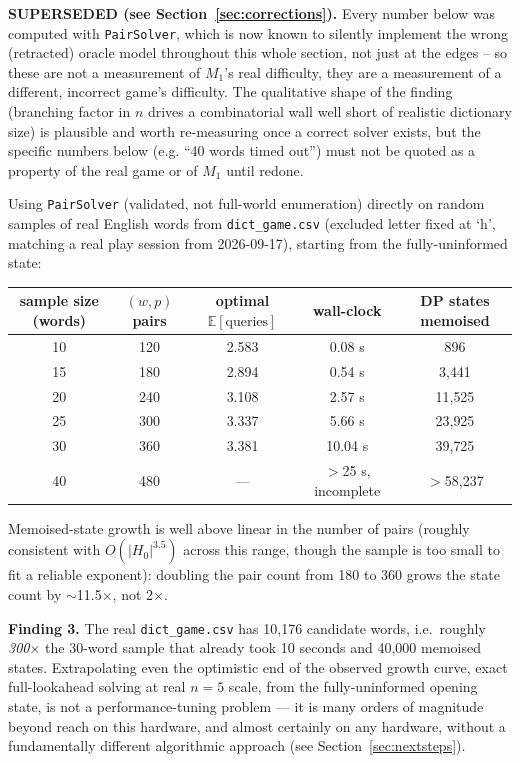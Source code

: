 \documentclass[11pt]{article}
\begin{document}
\textbf{SUPERSEDED (see Section~\ref{sec:corrections}).} Every number
below was computed with \texttt{PairSolver}, which is now known to
silently implement the wrong (retracted) oracle model throughout this
whole section, not just at the edges -- so these are not a measurement of
$M_1$'s real difficulty, they are a measurement of a different, incorrect
game's difficulty. The qualitative shape of the finding (branching factor
in $n$ drives a combinatorial wall well short of realistic dictionary
size) is plausible and worth re-measuring once a correct solver exists,
but the specific numbers below (e.g. ``40 words timed out'') must not be
quoted as a property of the real game or of $M_1$ until redone.

Using \texttt{PairSolver} (validated, not full-world enumeration) directly
on random samples of real English words from \texttt{dict\_game.csv}
(excluded letter fixed at `h', matching a real play session from
2026-09-17), starting from the fully-uninformed state:

\begin{center}
\begin{tabular}{ccccc}
\toprule
sample size (words) & $(w,p)$ pairs & optimal $\mathbb{E}[\text{queries}]$ & wall-clock & DP states memoised \\
\midrule
10 & 120 & 2.583 & 0.08 s  & 896 \\
15 & 180 & 2.894 & 0.54 s  & 3{,}441 \\
20 & 240 & 3.108 & 2.57 s  & 11{,}525 \\
25 & 300 & 3.337 & 5.66 s  & 23{,}925 \\
30 & 360 & 3.381 & 10.04 s & 39{,}725 \\
40 & 480 & --- & $>$25 s, incomplete & $>$58{,}237 \\
\bottomrule
\end{tabular}
\end{center}

Memoised-state growth is well above linear in the number of pairs (roughly
consistent with $O(|H_0|^{3.5})$ across this range, though the sample is
too small to fit a reliable exponent): doubling the pair count from 180 to
360 grows the state count by $\sim$11.5$\times$, not 2$\times$.

\textbf{Finding 3.} The real \texttt{dict\_game.csv} has 10{,}176
candidate words, i.e.\ roughly \emph{300$\times$} the 30-word sample that
already took 10 seconds and 40{,}000 memoised states. Extrapolating even
the optimistic end of the observed growth curve, exact full-lookahead
solving at real $n=5$ scale, from the fully-uninformed opening state, is
not a performance-tuning problem --- it is many orders of magnitude beyond
reach on this hardware, and almost certainly on any hardware, without a
fundamentally different algorithmic approach (see
Section~\ref{sec:nextsteps}).
\end{document}
